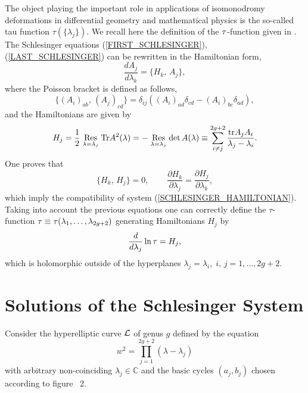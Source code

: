 \documentclass[11pt]{article}
\def\underset#1#2{\mathrel{\mathop{#2}\limits_{#1}}}
\def\be{\begin{equation}}
\def\ee{\end{equation}}
\def\l{\lambda}
\def\C{\mathbb{C}}
\def\la{\label}
\def\L{{\cal L}}
\def\log{\ln}
\begin{document}
The object playing the important role in  applications
of isomonodromy deformations in differential geometry and mathematical
physics is the so-called tau function $\tau(\{\l_j\})$. We recall 
here the definition of the $\bf\tau$-function given in
\cite{JM,SMJ,JMU}.\\
The Schlesinger equations (\ref{FIRST_SCHLESINGER}), 
(\ref{LAST_SCHLESINGER}) can be rewritten in the Hamiltonian form,
\begin{equation}
  \label{SCHLESINGER_HAMILTONIAN}
\frac{dA_j}{d\lambda_k}=\{H_k,\,A_j\},
\end{equation}
where the Poisson bracket is defined as follows,
\begin{equation}
  \label{POISSON_STRUCTURE}
\{(A_i)_{ab},\,(A_j)_{cd}\}=\delta_{ij}\left((A_i)_{ad}\delta_{cd}-
(A_i)_{bc}\delta_{ad}\right), 
\end{equation}
and the Hamiltonians are given by
\begin{equation}
  \label{DEF_H_J}
H_j=\frac 12\underset{\lambda=\lambda_j}
{\rm Res}{\rm Tr}A^2(\lambda)=-\underset{\lambda=\lambda_j}
{\rm Res}\det A(\lambda)\equiv\sum\limits_{i\neq j}^{2g+2}\frac{{\rm tr}
A_jA_i}{\lambda_j-\lambda_i}.
\end{equation} 
One proves that
\begin{equation}
  \label{H_RELATIONS}
\{H_k,\,H_j\}=0,\;\;\;\;\quad\frac{\partial H_k}{\partial\lambda_j}=
\frac{\partial H_j}{\partial\lambda_k},
\end{equation}
which imply the compatibility of system
(\ref{SCHLESINGER_HAMILTONIAN}). Taking into account the 
previous equations one can correctly define the $\tau$-function ${\bf\tau}\equiv{\bf\tau}
(\lambda_1,\dots,\lambda_{2g+2})$ generating Hamiltonians $H_j$ by 
\be
\frac d{d\lambda_j}\log{\bf\tau}=H_j,
\la{deftau}\ee                       
which is holomorphic outside of the hyperplanes $\lambda_j=\lambda_i,\;
i,\,j=1,\dots,2g+2$.











\section{Solutions of the Schlesinger System}
\setcounter{equation}{0}

Consider the hyperelliptic curve $\L$ of genus $g$ defined by the equation
\be
w^2=\prod_{j=1}^{2g+2}(\l-\l_j)
\la{L}\ee
with arbitrary non-coinciding 
$\l_j\in\C$ and the basic cycles $(a_j,b_j)$ chosen according to 
figure~ 2.
\end{document}

